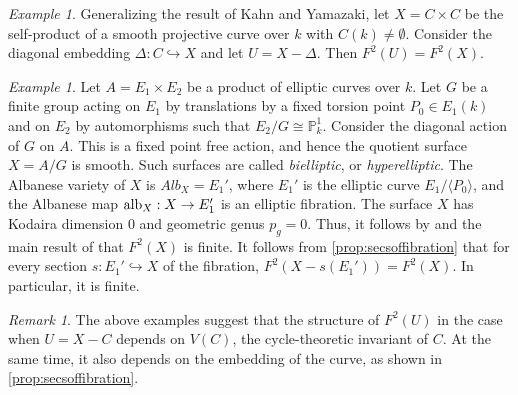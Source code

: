 \documentclass[12pt]{amsart}
\theoremstyle{remark}
\newtheorem{rem}[rem]{Remark}
\newtheorem{exm}[thm]{Example}
\renewcommand{\1}{{\mathbb{S}}}
\newcommand{\alb}{{\rm alb}}
\newcommand{\<}{\langle}
\renewcommand{\>}{\rangle}
\begin{document}
\begin{exm} Generalizing the result of Kahn and Yamazaki, let $X=C\times C$ be the self-product of a smooth projective curve over $k$ with $C(k)\neq\emptyset$. Consider the diagonal embedding $\Delta:C\hookrightarrow X$ and let $U=X-\Delta$. Then $F^2(U)=F^2(X)$. 
\end{exm}

\begin{exm}\label{ex:bielliptic} Let $A=E_1\times E_2$ be a product of elliptic curves over $k$. Let $G$ be a finite group acting on $E_1$ by translations by a fixed torsion point $P_0\in E_1(k)$ and on $E_2$ by automorphisms such that $E_2/G\cong\mathbb{P}^1_k$. Consider the diagonal action of $G$ on $A$. This is a fixed point free action, and hence the quotient surface $X=A/G$ is smooth. Such surfaces are called \textit{bielliptic}, or \textit{hyperelliptic}. The Albanese variety of $X$ is $Alb_X=E_1'$, where $E_1'$ is the elliptic curve $E_1/\langle P_0\rangle$, and the Albanese map $\alb_X: X\to E_1'$ is an elliptic fibration. The surface $X$ has Kodaira dimension $0$ and geometric genus $p_g=0$. Thus, it follows by \cite[Th\'{e}or\`{e}me D]{CTR} and the main result of \cite{BKL}   that $F^2(X)$ is finite.  It follows from \autoref{prop:secsoffibration} that for every section $s: E_1'\hookrightarrow X$  of the fibration,  $F^2(X-s(E_1'))=F^2(X)$. In particular, it is finite. 
\end{exm}


\begin{rem}
    The above examples suggest that the structure of $F^2(U)$ in the case when $U = X - C$ depends on $V(C)$, the cycle-theoretic invariant of $C$. At the same time, it also depends on the embedding of the curve, as shown in \autoref{prop:secsoffibration}. 
\end{rem}
\end{document}
